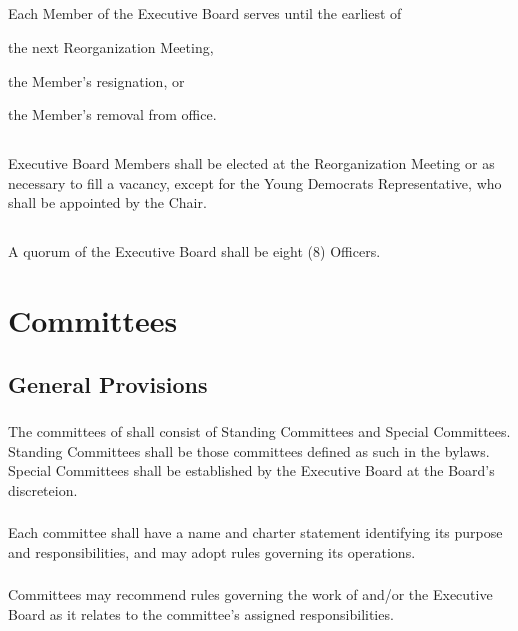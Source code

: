 \subsection{}
Each Member of the Executive Board serves until the earliest of
\begin{alphalist}
    \item the next Reorganization Meeting,
    \item the Member's resignation, or
    \item the Member's removal from office.
\end{alphalist}

\subsection{}
Executive Board Members shall be elected at the Reorganization Meeting or as necessary to fill a vacancy, except for the Young Democrats Representative, who shall be appointed by the Chair.

\subsection{}
A quorum of the Executive Board shall be eight (8) Officers.

\section{Committees}
\subsection{General Provisions}
\subsubsection{}
The committees of \thedistrict{} shall consist of Standing Committees and Special Committees. Standing Committees shall be those committees defined as such in the bylaws. Special Committees shall be established by the Executive Board at the Board's discreteion.

\subsubsection{}
Each committee shall have a name and charter statement identifying its purpose and responsibilities, and may adopt rules governing its operations.

\subsubsection{}
Committees may recommend rules governing the work of \thedistrict{} and/or the Executive Board as it relates to the committee's assigned responsibilities.

